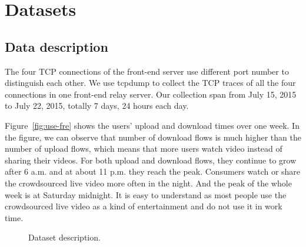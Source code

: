 
\section{Datasets}
\label{sec:dataset}

\subsection{Data description}
\label{sub:data-des}
The four TCP connections of the front-end server use different port number to distinguish each other. We use tcpdump to collect the TCP traces of all the four connections in one front-end relay server. Our collection span from July 15, 2015 to July 22, 2015, totally 7 days, 24 hours each day. 

Figure~\ref{fig:use-fre} shows the users' upload and download times over one week. In the figure, we can observe that number of download flows is much higher than the number of upload flows, which means that more users watch video instead of sharing their videos. For both upload and download flows, they continue to grow after 6 a.m. and at about 11 p.m. they reach the peak. Consumers watch or share the crowdsourced live video more often in the night. And the peak of the whole week is at Saturday midnight. It is easy to understand as most people use the crowdsourced live video as a kind of entertainment and do not use it in work time. 

\begin{figure}[t]
\centering
{}
\hspace{1em}%
	\hspace{1em}%
\caption{Dataset  description.}%
\label{fig:dataset} %
\termspace
\end{figure}


\iffalse
\begin{figure}[ht]
	\centering
	\texttt{[image: use-fre]}
	\caption{Number of users' upload and download flows.}
	\label{fig:use-fre}
	\termspace
\end{figure}
\fi

